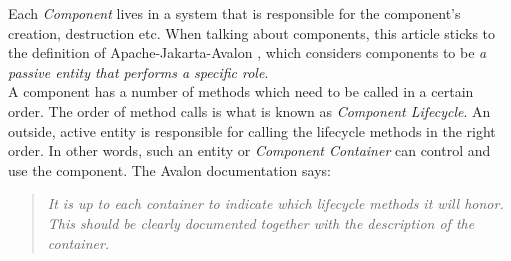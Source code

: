 Each \emph{Component} lives in a system that is responsible for the component's
creation, destruction etc. When talking about components, this article sticks
to the definition of Apache-Jakarta-Avalon \cite{jakarta}, which considers
components to be \emph{a passive entity that performs a specific role}.\\
A component has a number of methods which need to be called in a certain order.
The order of method calls is what is known as \emph{Component Lifecycle}.
An outside, active entity is responsible for calling the lifecycle methods
in the right order. In other words, such an entity or \emph{Component Container}
can control and use the component. The Avalon documentation \cite{jakarta} says:

\begin{quotation}
    \textit{
        It is up to each container to indicate which lifecycle methods it will honor.
        This should be clearly documented together with the description of the container.
    }
\end{quotation}

